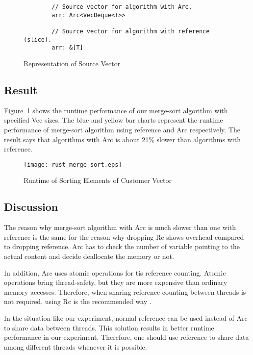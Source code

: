 \begin{figure}[htb]
    \begin{lstlisting}
        // Source vector for algorithm with Arc.
        arr: Arc<VecDeque<T>>

        // Source vector for algorithm with reference (slice).
        arr: &[T]
    \end{lstlisting}
    \caption{Representation of Source Vector}
    \label{fig:source_merge_sort}
\end{figure}


\subsection{Result}
Figure~\ref{fig:source_merge_sort} shows the runtime performance of our merge-sort algorithm with specified Vec sizes. 
The blue and yellow bar charts represent the runtime performance of merge-sort algorithm using reference and Arc respectively. 
The result says that algorithms with Arc is about 21\% slower than algorithms with reference.

\begin{figure}[htb]
    \texttt{[image: rust\_merge\_sort.eps]}
    \caption{Runtime of Sorting Elements of Customer Vector}
    \label{fig:merge_sort}
\end{figure}

\subsection{Discussion}
The reason why merge-sort algorithm with Arc is much slower than one with reference is 
the same for the reason why dropping Rc shows overhead compared to dropping reference.
Arc has to check the number of variable pointing to the actual content and decide 
deallocate the memory or not.

In addition, Arc uses atomic operations for tis reference counting. Atomic operations bring thread-safety, but they are more expensive than ordinary memory accesses.
Therefore, when sharing reference counting between threads is not required, using Rc is the recommended way \cite{RustArcPage}.

In the situation like our experiment, normal reference can be used instead of Arc to share data between threads. 
This solution results in better runtime performance in our experiment. Therefore, one should use reference to share data among different threads 
whenever it is possible.

